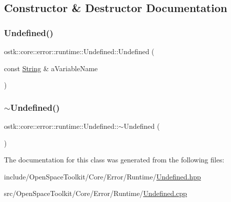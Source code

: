 \subsection{Constructor \& Destructor Documentation}
\mbox{\label{classostk_1_1core_1_1error_1_1runtime_1_1_undefined_a5ae214a1665596b08d53189168827a01}} 
\subsubsection{\texorpdfstring{Undefined()}{Undefined()}}
{\footnotesize\ttfamily ostk\+::core\+::error\+::runtime\+::\+Undefined\+::\+Undefined (\begin{DoxyParamCaption}\item[{const \hyperlink{classostk_1_1core_1_1types_1_1_string}{String} \&}]{a\+Variable\+Name }\end{DoxyParamCaption})}

\mbox{\label{classostk_1_1core_1_1error_1_1runtime_1_1_undefined_a0fd23d55bea868ae30b50f6d2690d6b9}} 
\subsubsection{\texorpdfstring{$\sim$\+Undefined()}{~Undefined()}}
{\footnotesize\ttfamily ostk\+::core\+::error\+::runtime\+::\+Undefined\+::$\sim$\+Undefined (\begin{DoxyParamCaption}{ }\end{DoxyParamCaption})}



The documentation for this class was generated from the following files\+:\begin{DoxyCompactItemize}
\item 
include/\+Open\+Space\+Toolkit/\+Core/\+Error/\+Runtime/\hyperlink{_undefined_8hpp}{Undefined.\+hpp}\item 
src/\+Open\+Space\+Toolkit/\+Core/\+Error/\+Runtime/\hyperlink{_undefined_8cpp}{Undefined.\+cpp}\end{DoxyCompactItemize}
